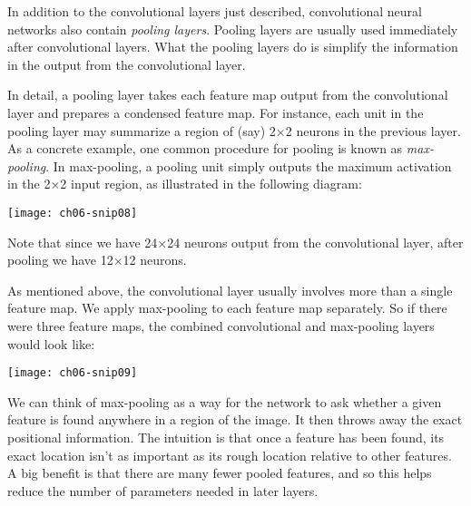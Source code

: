  In addition to the convolutional layers just described, convolutional neural networks also contain \textit{pooling layers}. Pooling layers are usually used immediately after convolutional layers. What the pooling layers do is simplify the information in the output from the convolutional layer.

In detail, a pooling layer takes each feature map output from the convolutional layer and prepares a condensed feature map. For instance, each unit in the pooling layer may summarize a region of (say) 2$\times$2 neurons in the previous layer. As a concrete example, one common procedure for pooling is known as \textit{max-pooling}. In max-pooling, a pooling unit simply outputs the maximum activation in the 2$\times$2 input region, as illustrated in the following diagram:

\begin{figure*}[tph]
    \texttt{[image: ch06-snip08]}
    \end{figure*}

Note that since we have 24$\times$24 neurons output from the convolutional layer, after pooling we have 12$\times$12 neurons.

As mentioned above, the convolutional layer usually involves more than a single feature map. We apply max-pooling to each feature map separately. So if there were three feature maps, the combined convolutional and max-pooling layers would look like:

\begin{figure*}[tph]
    \texttt{[image: ch06-snip09]}
    \end{figure*}

We can think of max-pooling as a way for the network to ask whether a given feature is found anywhere in a region of the image. It then throws away the exact positional information. The intuition is that once a feature has been found, its exact location isn't as important as its rough location relative to other features. A big benefit is that there are many fewer pooled features, and so this helps reduce the number of parameters needed in later layers.

